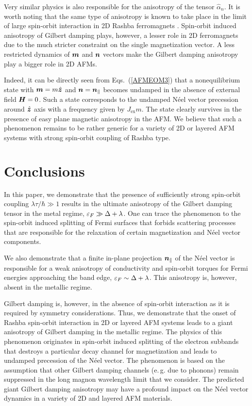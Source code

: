 Very similar physics is also responsible for the anisotropy of the tensor $\hat{\alpha}_n$. It is worth noting that the same type of anisotropy is known to take place in the limit of large spin-orbit interaction in 2D Rashba ferromagnets \cite{AdoSTTGD2019}. Spin-orbit induced anisotropy of Gilbert damping plays, however, a lesser role in 2D ferromagnets due to the much stricter constraint on the single magnetization vector.  A less restricted dynamics of $\boldsymbol{m}$ and $\boldsymbol{n}$ vectors make the Gilbert damping anisotropy play a bigger role in 2D AFMs. 

Indeed, it can be directly seen from Eqs.~(\ref{AFMEOM3}) that a nonequilibrium state with  $\boldsymbol{m}=m \hat{\boldsymbol{z}}$ and $\boldsymbol{n}=\boldsymbol{n}_\parallel$ becomes undamped in the absence of external field $\boldsymbol{H}=0$. Such a state corresponds to the undamped N\'eel vector precession around $\hat{\boldsymbol{z}}$ axis with a frequency given by $J_\textrm{ex} m$. The state clearly survives in the presence of easy plane magnetic anisotropy in the AFM. We believe that such a phenomenon remains to be rather generic for a variety of 2D or layered AFM systems with strong spin-orbit coupling of Rashba type. 

\section{Conclusions}

In this paper, we demonstrate that the presence of sufficiently strong spin-orbit coupling $\lambda\tau/\hbar \gg 1$ results in the ultimate anisotropy of the Gilbert damping tensor in the metal regime, $\varepsilon_F\gg\Delta+\lambda$.  One can trace the phenomenon to the spin-orbit induced splitting of Fermi surfaces that forbids scattering processes that are responsible for the relaxation of certain magnetization and N\'eel vector components. 

We also demonstrate that a finite in-plane projection $\boldsymbol{n}_\parallel$ of the N\'eel vector is responsible for a weak anisotropy of conductivity and spin-orbit torques for Fermi energies approaching the band edge, $\varepsilon_F \sim \Delta+\lambda$. This anisotropy is, however, absent in the metallic regime. 

Gilbert damping is, however, in the absence of spin-orbit interaction as it is required by symmetry considerations. Thus, we demonstrate that the onset of Rashba spin-orbit interaction in 2D or layered AFM systems leads to a giant anisotropy of Gilbert damping in the metallic regime. The physics of this phenomenon originates in spin-orbit induced splitting of the electron subbands that destroys a particular decay channel for magnetization and leads to undamped precession of the N\'eel vector. The phenomenon is based on the assumption that other Gilbert damping channels  (e.\,g. due to phonons) remain suppressed in the long magnon wavelength limit that we consider. The predicted giant Gilbert damping anisotropy  may have a profound impact on the N\'eel vector dynamics in a variety of 2D and layered AFM materials. 

